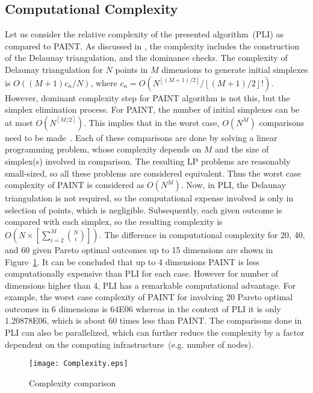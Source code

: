 {\color{blue}
	\subsection{Computational Complexity}
	Let us consider the relative complexity of the presented algorithm~(PLI) as compared to PAINT. As discussed in \cite{hartikainen2012paint}, the complexity includes the construction of the Delaunay triangulation, and the dominance checks. The complexity of Delaunay triangulation for $N$ points in $M$ dimensions to generate initial simplexes is $O((M+1)c_n/N)$, where $c_n=O(N^{{\left\lfloor (M+1)/2\right\rfloor}}/\left\lfloor (M+1)/2\right\rfloor!)$. However, dominant complexity step for PAINT algorithm is not this, but the simplex elimination process. For PAINT, the number of initial simplexes can be at most $O(N^{\left\lceil  M/2\right\rceil})$. This implies that in the worst case, $O(N^M)$ comparisons need to be made~\cite{hartikainen2012paint}. Each of these comparisons are done by solving a linear programming problem, whose complexity depends on $M$ and the size of simplex(s) involved in comparison. The resulting LP problems are reasonably small-sized, so all these problems are considered equivalent. Thus the worst case complexity of PAINT is considered as $O(N^M)$. Now, in PLI, the Delaunay triangulation is not required, so the computational expense involved is only in selection of points, which is negligible. Subsequently, each given outcome is compared with each simplex, so the resulting complexity is $O\left(N \times \left[\sum_{i=2}^M {N \choose i}\right]\right)$. The difference in computational complexity for 20, 40, and 60 given Pareto optimal outcomes up to 15 dimensions are shown in Figure~\ref{fig:complexity}. It can be concluded that up to 4 dimensions PAINT is less computationally expensive than PLI for each case. However for number of dimensions higher than 4, PLI has a remarkable computational advantage. For example, the worst case complexity of PAINT for involving 20 Pareto optimal outcomes in 6 dimensions is 64E06 whereas in the context of PLI it is only 1.20878E06, which is about 60 times less than PAINT. The comparisons done in PLI can also be parallelized, which can further reduce the complexity by a factor dependent on the computing infrastructure~(e.g. number of nodes).
	
	\begin{figure}[!ht]
		\centering
		\texttt{[image: Complexity.eps]}
		\caption{Complexity comparison}
		\label{fig:complexity}
	\end{figure}
}

